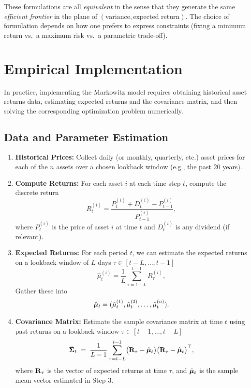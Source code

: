 These formulations are all \emph{equivalent} in the sense that they generate the same \emph{efficient frontier} in the plane of $(\text{variance}, \text{expected return})$. The choice of formulation depends on how one prefers to express constraints (fixing a minimum return vs.\ a maximum risk vs.\ a parametric trade-off).


\section{Empirical Implementation} 
In practice, implementing the Markowitz model requires obtaining historical asset returns data, estimating expected returns and the covariance matrix, and then solving the corresponding optimization problem numerically. 

\subsection{Data and Parameter Estimation}
\begin{enumerate}
    \item \textbf{Historical Prices:} Collect daily (or monthly, quarterly, etc.) asset prices for each of the $n$ assets over a chosen lookback window (e.g., the past 20 years).
    \item \textbf{Compute Returns:} For each asset $i$ at each time step $t$, compute the discrete return
    $$
        R_t^{(i)} = \frac{P_t^{(i)} + D_t^{(i)} - P_{t-1}^{(i)}}{P_{t-1}^{(i)}},
    $$
    where $P_t^{(i)}$ is the price of asset $i$ at time $t$ and $D_t^{(i)}$ is any dividend (if relevant).
    \item \textbf{Expected Returns:} For each period $t$, we can estimate the expected returns on a lookback window of $L$ days $\tau \in [t-L,...,t-1]$
    $$
        \hat{\mu}_t^{(i)} = \frac{1}{L}\sum_{\tau=t-L}^{t-1} R_{\tau}^{(i)},
    $$
     Gather these into
    $$
        \hat{\boldsymbol \mu}_t = (\hat{\mu}_t^{(1)}, \hat{\mu}_t^{(2)}, \ldots, \hat{\mu}_t^{(n)}).
    $$
    \item \textbf{Covariance Matrix:} Estimate the sample covariance matrix at time $t$ using past returns on a lookback window $\tau\in[t-1,...,t-L]$
    $$
        \hat{\mathbf \Sigma}_t 
        \;=\;
        \frac{1}{L-1}\sum_{\tau=t-L}^{t-1}
        \bigl(\mathbf R_{\tau} - \hat{\boldsymbol \mu}_t\bigr)\bigl(\mathbf R_{\tau } - \hat{\boldsymbol \mu}_t\bigr)^\top,
    $$
    where $\mathbf R_\tau$ is the vector of expected returns at time $\tau$, and $\hat{\boldsymbol \mu}_t$ is the sample mean vector estimated in Step 3.
\end{enumerate}

